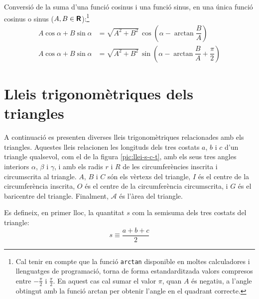 Conversió de la suma d'una funció cosinus i una funció sinus, en una única
funció cosinus o sinus ($A,B\in{\ensuremath{\boldsymbol{\mathsf{R}}}}$):\footnote{Cal tenir en compte que la funció \texttt{arctan} disponible en moltes calculadores i llenguatges de programació, torna de forma estandarditzada valors compresos entre $-\frac{\pi}{2}$ i $\frac{\pi}{2}$. En aquest cas cal sumar el valor $\pi$, quan $A$ és negatiu, a l'angle obtingut amb la funció \textsf{arctan} per obtenir l'angle en el quadrant correcte.}
\begin{subequations}
\begin{align}
    A \cos \alpha + B \sin \alpha &= \sqrt{A^2+B^2}\, \cos \left(\alpha - \arctan\dfrac{B}{A}\right)\label{eq:AcosBsin}\\[1ex]
    A \cos \alpha + B \sin \alpha &= \sqrt{A^2+B^2}\, \sin \left(\alpha - \arctan\dfrac{B}{A}+\dfrac{\pi}{2}\right)\label{eq:AcosBsinS}
\end{align}
\end{subequations}

\break

\section{Lleis trigonomètriques dels triangles}\label{sec:lleis-trig-triang}

A continuació es presenten diverses lleis trigonomètriques relacionades amb els triangles. Aquestes lleis relacionen les longituds dels tres costats $a$, $b$ i $c$ d'un triangle qualsevol, com el de
la figura \vref{pic:llei-s-c-t}, amb els seus tres angles interiors
$\alpha$, $\beta$ i $\gamma$, i amb els radis $r$ i $R$ de les circumferències inscrita i circumscrita al triangle. $A$, $B$ i $C$ són els vèrtexs del triangle, $I$ és el centre de la circumferència inscrita, $O$   és el centre de la circumferència circumscrita, i $G$ és el baricentre del triangle. Finalment, $\mathscr{A}$ és l'àrea del triangle.

\begin{center}
    
     \label{pic:llei-s-c-t}
\end{center}

Es defineix, en primer lloc, la quantitat $s$ com la semisuma dels tres costats del triangle:
\begin{equation}
	s \equiv \frac{a+b+c}{2}
\end{equation}

